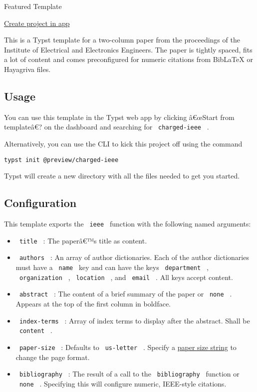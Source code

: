 { } Featured Template

\href{/app?template=charged-ieee&version=0.1.3}{Create project in app}

\label{readme}
This is a Typst template for a two-column paper from the proceedings of
the Institute of Electrical and Electronics Engineers. The paper is
tightly spaced, fits a lot of content and comes preconfigured for
numeric citations from BibLaTeX or Hayagriva files.

\subsection{Usage}\label{usage}

You can use this template in the Typst web app by clicking â€œStart from
templateâ€? on the dashboard and searching for \texttt{\ charged-ieee\ }
.

Alternatively, you can use the CLI to kick this project off using the
command

\begin{verbatim}
typst init @preview/charged-ieee
\end{verbatim}

Typst will create a new directory with all the files needed to get you
started.

\subsection{Configuration}\label{configuration}

This template exports the \texttt{\ ieee\ } function with the following
named arguments:

\begin{itemize}
\tightlist
\item
  \texttt{\ title\ } : The paperâ€™s title as content.
\item
  \texttt{\ authors\ } : An array of author dictionaries. Each of the
  author dictionaries must have a \texttt{\ name\ } key and can have the
  keys \texttt{\ department\ } , \texttt{\ organization\ } ,
  \texttt{\ location\ } , and \texttt{\ email\ } . All keys accept
  content.
\item
  \texttt{\ abstract\ } : The content of a brief summary of the paper or
  \texttt{\ none\ } . Appears at the top of the first column in
  boldface.
\item
  \texttt{\ index-terms\ } : Array of index terms to display after the
  abstract. Shall be \texttt{\ content\ } .
\item
  \texttt{\ paper-size\ } : Defaults to \texttt{\ us-letter\ } . Specify
  a
  \href{https://typst.app/docs/reference/layout/page/\#parameters-paper}{paper
  size string} to change the page format.
\item
  \texttt{\ bibliography\ } : The result of a call to the
  \texttt{\ bibliography\ } function or \texttt{\ none\ } . Specifying
  this will configure numeric, IEEE-style citations.
\end{itemize}

